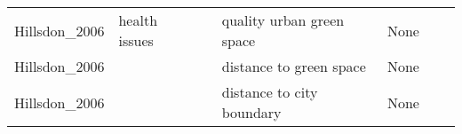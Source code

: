\documentclass{article}
\begin{document}
\begin{table}
\begin{tabular}{lllllll}
Hillsdon\_2006   & health issues                                                                                       &         & quality urban green space                                                                     & None                                                                                                                                                                                             &                                       &          \\
Hillsdon\_2006   &                                                                                                     &         & distance to green space                                                                       & None                                                                                                                                                                                             &                                       &          \\
Hillsdon\_2006   &                                                                                                     &         & distance to city boundary                                                                     & None                                                                                                                                                                                             &                                       &          \\
\bottomrule
\end{tabular}
\end{table}
\end{document}
